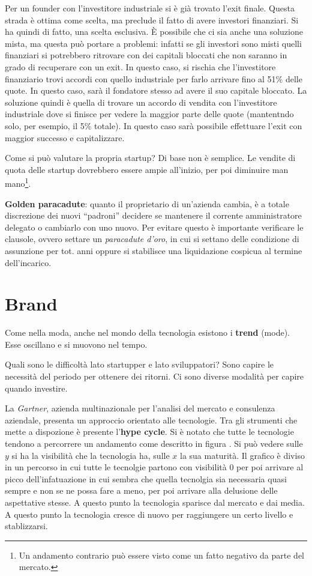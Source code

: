 Per un founder con l'investitore industriale si è già trovato l'exit finale.
Questa strada è ottima come scelta, ma preclude il fatto di avere investori
finanziari. Si ha quindi di fatto, una scelta esclusiva.
È possibile che ci sia anche una soluzione mista, ma questa può portare a
problemi: infatti se gli investori sono misti quelli finanziari si potrebbero
ritrovare con dei capitali bloccati che non saranno in grado di recuperare con
un exit. In questo caso, si rischia che l'investitore finanziario trovi accordi
con quello industriale per farlo arrivare fino al 51\% delle quote. In questo
caso, sarà il fondatore stesso ad avere il suo capitale bloccato. La soluzione
quindi è quella di trovare un accordo di vendita con l'investitore industriale
dove si finisce per vedere la maggior parte delle quote (mantentndo solo, per
esempio, il 5\% totale). In questo caso sarà possibile effettuare l'exit con
maggior successo e capitalizzare.

Come si può valutare la propria startup? Di base non è semplice. Le vendite di
quota delle startup dovrebbero essere ampie all'inizio, per poi diminuire man
mano\footnote{Un andamento contrario può essere visto come un fatto negativo da
parte del mercato.}.

\textbf{Golden paracadute}: quanto il proprietario di un'azienda cambia, è a
totale discrezione dei nuovi ``padroni'' decidere se mantenere il corrente
amministratore delegato o cambiarlo con uno nuovo. Per evitare questo è
importante verificare le clausole, ovvero settare un \textit{paracadute d'oro},
in cui si settano delle condizione di assunzione per tot. anni oppure si
stabilisce una liquidazione cospicua al termine dell'incarico.

\chapter{Brand}

Come nella moda, anche nel mondo della tecnologia esistono i \textbf{trend}
(mode). Esse oscillano e si muovono nel tempo.

Quali sono le difficoltà lato startupper e lato sviluppatori? Sono capire le
necessità del periodo per ottenere dei ritorni. Ci sono diverse modalità per
capire quando investire.

La \textit{Gartner}, azienda multinazionale per l'analisi del mercato e
consulenza aziendale, presenta un approccio orientato alle tecnologie. Tra gli
strumenti che mette a dispozione è presente l'\textbf{hype cycle}.
Si è notato che tutte le tecnologie tendono a percorrere un andamento come
descritto in figura .
Si può vedere sulle $y$ si ha la visibilità che la tecnologia ha, sulle $x$ la
sua maturità. Il grafico è diviso in un percorso in cui tutte le tecnolgie
partono con visibilità 0 per poi arrivare al picco dell'infatuazione in cui
sembra che quella tecnolgia sia necessaria quasi sempre e non se ne possa fare
a meno, per poi arrivare alla delusione delle aspettative stesse. A questo
punto la tecnologia sparisce dal mercato e dai media. A questo punto la
tecnologia cresce di nuovo per raggiungere un certo livello e stablizzarsi.


